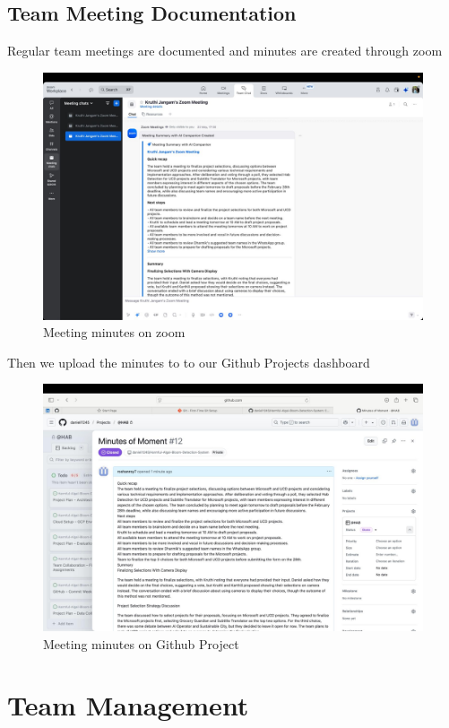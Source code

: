 \documentclass[12pt]{article}
\begin{document}
\subsection{Team Meeting Documentation}
Regular team meetings are documented and minutes are created through zoom

\begin{figure}[H]
\centering
\includegraphics[width=0.8\linewidth]{Meetings.jpeg}
\captionsetup{width=.8\linewidth} 
\caption[Team Meeting Minutes]{Meeting minutes on zoom}
\label{fig:meeting}
\end{figure}

Then we upload the minutes to to our Github Projects dashboard

\begin{figure}[H]
\centering
\includegraphics[width=0.8\linewidth]{Meetings2.jpeg}
\captionsetup{width=.8\linewidth} 
\caption[Team Meeting Minutes]{Meeting minutes on Github Project}
\label{fig:meeting}
\end{figure}


\section{Team Management}
\end{document}
